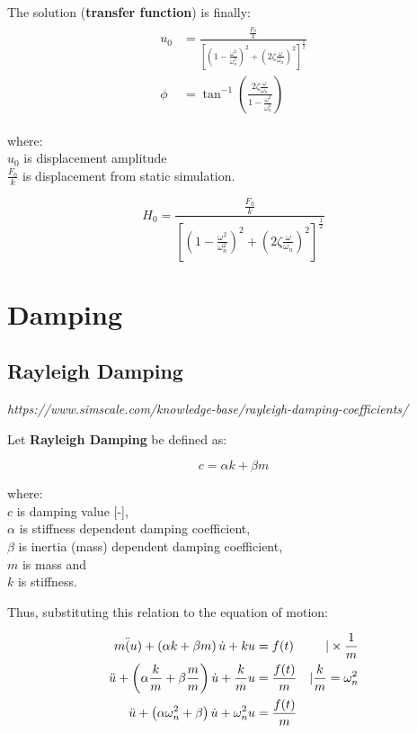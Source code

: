 \documentclass[10pt,b5paper,titlepage]{book}
\newenvironment{ematrix}
{
    \begin{eqnarray}
        \begin{aligned}
}
{
        \end{aligned}
    \end{eqnarray}
}
\begin{document}
The solution (\textbf{transfer function}) is finally:
\begin{ematrix}
    u_0 &= \frac{\frac{F_0}{k}}{
        \left[
            \left( 1 - \frac{\omega^2}{\omega_n^2} \right)^2 +
            \left( 2 \zeta \frac{\omega}{\omega_n} \right)^2
    \right]^{\frac{1}{2}}}\\
    \phi &= \tan^{-1} \left(
        \frac{2 \zeta \frac{\omega}{\omega_n}}{
    1 - \frac{\omega^2}{\omega_n^2}} \right)
\end{ematrix}

where:\\
$ u_0 $ is displacement amplitude\\
$ \frac{F_0}{k} $ is displacement from static simulation.

\begin{equation}
    H_0 = \frac{\frac{F_0}{k}}{
        \left[
            \left( 1 - \frac{\omega^2}{\omega_n^2} \right)^2 +
            \left( 2 \zeta \frac{\omega}{\omega_n} \right)^2
    \right]^{\frac{1}{2}}}
\end{equation}





\newpage
\section{Damping}

\subsection{Rayleigh Damping}
\textit{https://www.simscale.com/knowledge-base/rayleigh-damping-coefficients/}

Let \textbf{Rayleigh Damping} be defined as:

\begin{equation}
    c = \alpha k + \beta m
\end{equation}

where:\\
$ c $ is damping value [-],\\
$ \alpha $ is stiffness dependent damping coefficient,\\
$ \beta $ is inertia (mass) dependent damping coefficient,\\
$ m $ is mass and\\
$ k $ is stiffness.

Thus, substituting this relation to the equation of motion:

\begin{ematrix}
    m \ddot(u) + \left(\alpha k + \beta m \right) \dot{u} + k u &= f(t) & \space \vert \times \frac{1}{m}\\
    \ddot{u} + \left(\alpha \frac{k}{m} + \beta \frac{m}{m} \right) \dot{u} + \frac{k}{m} u
    &= \frac{f(t)}{m} & \space \vert \frac{k}{m} = \omega_n^2 \\
    \ddot{u} + \left(\alpha \omega_n^2 + \beta \right) \dot{u} + \omega_n^2 u &= \frac{f(t)}{m} & \space
\end{ematrix}
\end{document}
